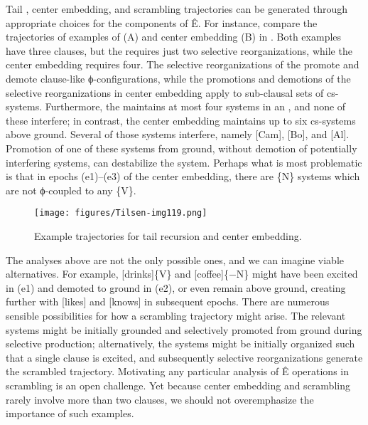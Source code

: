   Tail , center embedding, and scrambling trajectories can be generated through appropriate choices for the components of Ê. For instance, compare the trajectories of examples of  (A) and center embedding (B) in {}. Both examples have three clauses, but the  requires just two selective reorganizations, while the center embedding requires four. The selective reorganizations of the  promote and demote clause-like ϕ-con\-fig\-u\-ra\-tions, while the promotions and demotions of the selective reorganizations in center embedding apply to sub-clausal sets of cs-sys\-tems. Furthermore, the  maintains at most four systems in an , and none of these interfere; in contrast, the center embedding maintains up to six cs-sys\-tems above ground. Several of those systems interfere, namely [Cam], [Bo], and [Al]. Promotion of one of these systems from ground, without demotion of potentially interfering systems, can destabilize the system. Perhaps what is most problematic is that in epochs (e1)--(e3) of the center embedding, there are \{N\} systems which are not ϕ-coupled to any \{V\}.

  
\begin{figure}
\texttt{[image: figures/Tilsen-img119.png]}
\caption{Example trajectories for tail recursion and center embedding.}
\label{fig:5:15}
\end{figure}
 
   The analyses above are not the only possible ones, and we can imagine viable alternatives. For example, [drinks]\{V\} and [coffee]\{−N\} might have been excited in (e1) and demoted to ground in (e2), or even remain above ground, creating further  with [likes] and [knows] in subsequent epochs. There are numerous sensible possibilities for how a scrambling trajectory might arise. The relevant systems might be initially grounded and selectively promoted from ground during selective production; alternatively, the systems might be initially organized such that a single clause is excited, and subsequently selective reorganizations generate the scrambled trajectory. Motivating any particular analysis of Ê operations in scrambling is an open challenge. Yet because center embedding and scrambling rarely involve more than two clauses, we should not overemphasize the importance of such examples.

